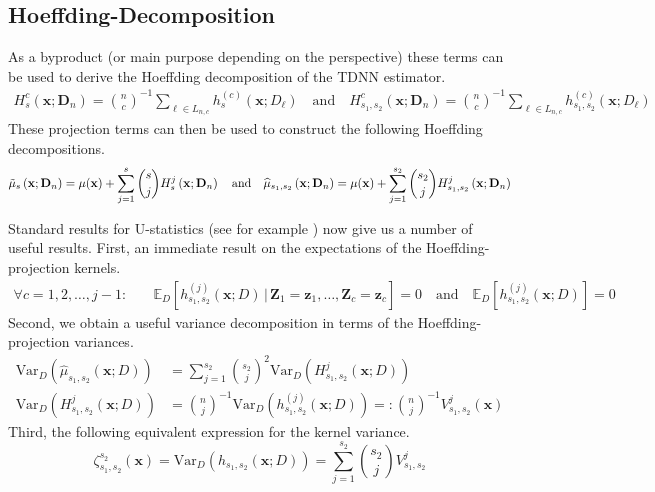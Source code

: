 \documentclass[letterpaper,10pt]{article}
\numberwithin{equation}{section}
\numberwithin{thm}{section}
\numberwithin{lem}{section}
\numberwithin{cor}{section}
\renewcommand{\hat}{\widehat}
\newcommand{\E}{\mathbb{E}}
\newcommand{\1}{\mathbbm{1}}
\newcommand{\Var}{\text{Var}}
\begin{document}
\subsection{Hoeffding-Decomposition}
As a byproduct (or main purpose depending on the perspective) these terms can be used to derive the Hoeffding decomposition of the TDNN estimator.
\begin{equation}\label{eq:H_projection}
	\begin{aligned}
		H_{s}^{c}\left(\mathbf{x}; \mathbf{D}_n\right)
		= \binom{n}{c}^{-1} \sum_{\ell \in L_{n,c}} h^{(c)}_{s}(\mathbf{x}; D_{\ell})
		\quad \text{and} \quad
		H_{s_1, s_2}^{c}\left(\mathbf{x}; \mathbf{D}_n\right)
		= \binom{n}{c}^{-1} \sum_{\ell \in L_{n,c}} h^{(c)}_{s_1, s_2}(\mathbf{x}; D_{\ell})
	\end{aligned}
\end{equation}
These projection terms can then be used to construct the following Hoeffding decompositions.
\begin{equation}\label{eq:H_Decomp}
	\tilde{\mu}_{s}\left(\mathbf{x}; \mathbf{D}_n\right)
	= \mu(\mathbf{x}) + \sum_{j = 1}^{s}\binom{s}{j}H_{s}^{j}\left(\mathbf{x}; \mathbf{D}_n\right)\\
	\quad \text{and} \quad
	\hat{\mu}_{s_1, s_2}\left(\mathbf{x}; \mathbf{D}_n\right)
	= \mu(\mathbf{x}) + \sum_{j = 1}^{s_2}\binom{s_2}{j}H_{s_1, s_2}^{j}\left(\mathbf{x}; \mathbf{D}_n\right)
\end{equation}

Standard results for U-statistics (see for example \citet{lee_u-statistics_2019}) now give us a number of useful results.
First, an immediate result on the expectations of the Hoeffding-projection kernels.
\begin{align}\label{eq:H_k_expectation}
	\forall c = 1,2,\dotsc, j-1: \quad & \E_{D}\left[h_{s_1, s_2}^{(j)}\left(\mathbf{x}; D\right) \, | \, \mathbf{Z}_1 = \mathbf{z}_1, \dotsc, \mathbf{Z}_c = \mathbf{z}_c\right] = 0
	\quad \text{and} \quad
	\E_{D}\left[h_{s_1, s_2}^{(j)}\left(\mathbf{x}; D\right)\right] = 0
\end{align}
Second, we obtain a useful variance decomposition in terms of the Hoeffding-projection variances.
\begin{align}\label{eq:Var_decomp}
	\Var_{D}\left(\hat{\mu}_{s_1, s_2}\left(\mathbf{x}; D\right)\right)
	 & = \sum_{j = 1}^{s_2} \binom{s_2}{j}^2 \Var_{D}\left(H_{s_1, s_2}^{j}\left(\mathbf{x}; D\right)\right) \\
	\Var_{D}\left(H_{s_1, s_2}^{j}\left(\mathbf{x}; D\right)\right)
	 & = \binom{n}{j}^{-1} \Var_{D}\left(h_{s_1, s_2}^{(j)}\left(\mathbf{x}; D\right)\right)
	=: \binom{n}{j}^{-1} V_{s_1, s_2}^{j}\left(\mathbf{x}\right)
\end{align}
Third, the following equivalent expression for the kernel variance.
\begin{equation}\label{eq:k_var}
	\zeta_{s_1, s_2}^{s_2}\left(\mathbf{x}\right)
	= \Var_{D}\left(h_{s_1, s_2}\left(\mathbf{x}; D\right)\right)
	= \sum_{j = 1}^{s_2} \binom{s_2}{j}V_{s_1, s_2}^{j}
\end{equation}
\end{document}
